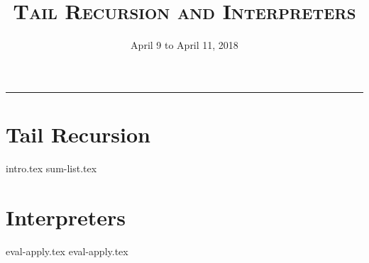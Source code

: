 \documentclass{exam}
\title{\textsc{Tail Recursion and Interpreters}}
\date{April 9 to April 11, 2018}
\begin{document}
\maketitle
\rule{\textwidth}{0.15em}
\fontsize{12}{15}\selectfont



\section{Tail Recursion}
\begin{questions}
{intro.tex}
{sum-list.tex}
\end{questions}

\section{Interpreters}
\begin{questions}
{eval-apply.tex}
{eval-apply.tex}
\end{questions}

\end{document}
